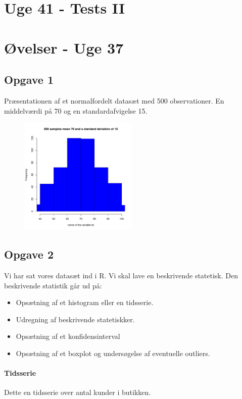 \documentclass{article}
\begin{document}
\section{Uge 41 - Tests II}


\section{Øvelser - Uge 37}
\subsection{Opgave 1}
Præsentationen af et normalfordelt datasæt med 500 observationer. En middelværdi
på 70 og en standardafvigelse 15.
\begin{figure}[H] 
  \centering
  \includegraphics[width=0.5\textwidth]{../velser/uge37/R/plot.pdf}
\end{figure}

\subsection{Opgave 2}
Vi har sat vores datasæt ind i R. Vi skal lave en beskrivende statetisk. Den
beskrivende statistik går ud på:
\begin{itemize}
  \item Opsætning af et histogram eller en tidsserie.
  \item Udregning af beskrivende statetiskker.
  \item Opsætning af et konfidensinterval
  \item Opsætning af et boxplot og undersøgelse af eventuelle outliers.
\end{itemize}

\paragraph{Tidsserie} Dette en tidsserie over antal kunder i butikken.
\end{document}
